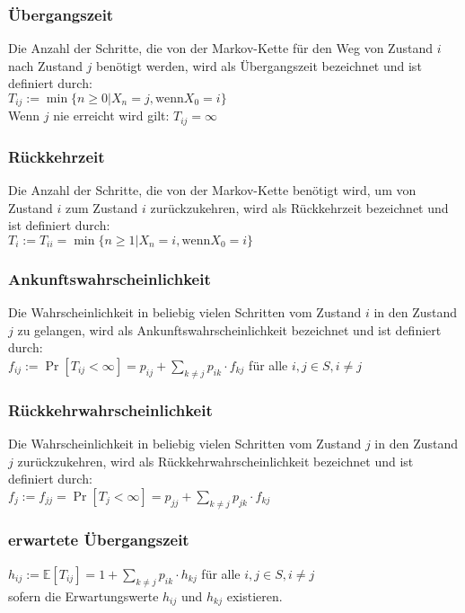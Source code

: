 \documentclass[a4paper,9pt]{extarticle}
\begin{document}
\subsubsection*{Übergangszeit}
Die Anzahl der Schritte, die von der Markov-Kette für den Weg von Zustand $i$ nach Zustand $j$ benötigt werden, wird als Übergangszeit bezeichnet und ist definiert durch: \\
$T_{ij} := \min \{n ≥ 0 | X_n = j, \text{wenn} X_0 =i\}$ \\

Wenn $j$ nie erreicht wird gilt: $T_{ij} = ∞$

\subsubsection*{Rückkehrzeit}
Die Anzahl der Schritte, die von der Markov-Kette benötigt wird, um von Zustand $i$ zum Zustand $i$ zurückzukehren, wird als Rückkehrzeit bezeichnet und ist definiert durch: \\
$T_i := T_{ii} = \min \{n ≥ 1 | X_n = i, \text{wenn} X_0 = i \}$

\subsubsection*{Ankunftswahrscheinlichkeit}
Die Wahrscheinlichkeit in beliebig vielen Schritten vom Zustand $i$ in den Zustand $j$ zu gelangen, wird als Ankunftswahrscheinlichkeit bezeichnet und ist definiert durch: \\
$f_{ij} := \Pr[T_{ij} < ∞] = p_{ij} + \sum_{k ≠ j} p_{ik} ⋅ f_{kj}$ für alle $i, j \in S, i ≠ j$

\subsubsection*{Rückkehrwahrscheinlichkeit}
Die Wahrscheinlichkeit in beliebig vielen Schritten vom Zustand $j$ in den Zustand $j$ zurückzukehren, wird als Rückkehrwahrscheinlichkeit bezeichnet und ist definiert durch: \\
$f_j := f_{jj} = \Pr[T_j < ∞] = p_{jj} + \sum_{k ≠ j} p_{jk} ⋅ f_{kj}$

\subsubsection*{erwartete Übergangszeit}
$h_{ij} := \mathbb{E}[T_{ij}] = 1 + \sum_{k ≠ j} p_{ik} ⋅ h_{kj}$ für alle $i,j \in S, i ≠ j$ \\
sofern die Erwartungswerte $h_{ij}$ und $h_{kj}$ existieren.
\end{document}
